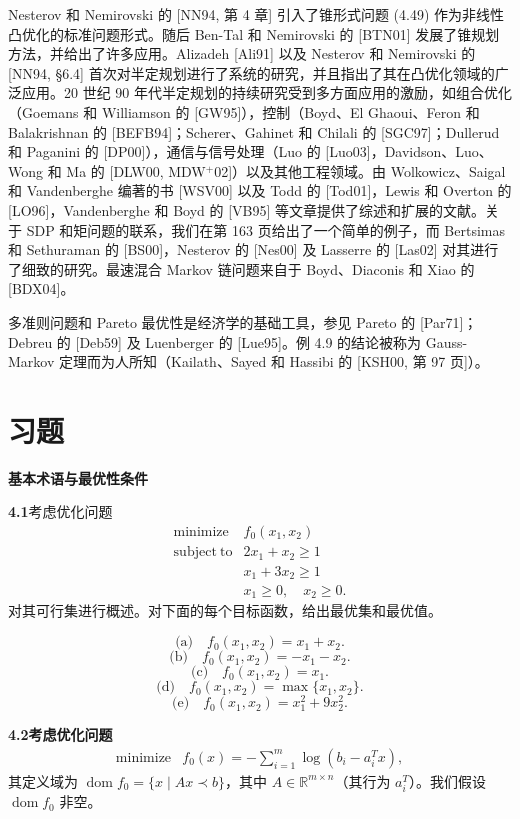 \documentclass[UTF8,12pt,a4paper,fontset=fandol]{ctexart}
\begin{document}
Nesterov 和 Nemirovski 的 [NN94, 第 4 章] 引入了锥形式问题 (4.49) 作为非线性凸优化的标准问题形式。随后 Ben-Tal 和 Nemirovski 的 [BTN01] 发展了锥规划方法，并给出了许多应用。Alizadeh [Ali91] 以及 Nesterov 和 Nemirovski 的 [NN94, \S 6.4] 首次对半定规划进行了系统的研究，并且指出了其在凸优化领域的广泛应用。20 世纪 90 年代半定规划的持续研究受到多方面应用的激励，如组合优化（Goemans 和 Williamson 的 [GW95]），控制（Boyd、El Ghaoui、Feron 和 Balakrishnan 的 [BEFB94]；Scherer、Gahinet 和 Chilali 的 [SGC97]；Dullerud 和 Paganini 的 [DP00]），通信与信号处理（Luo 的 [Luo03]，Davidson、Luo、Wong 和 Ma 的 [DLW00, MDW$^+$02]）以及其他工程领域。由 Wolkowicz、Saigal 和 Vandenberghe 编著的书 [WSV00] 以及 Todd 的 [Tod01]，Lewis 和 Overton 的 [LO96]，Vandenberghe 和 Boyd 的 [VB95] 等文章提供了综述和扩展的文献。关于 SDP 和矩问题的联系，我们在第 163 页给出了一个简单的例子，而 Bertsimas 和 Sethuraman 的 [BS00]，Nesterov 的 [Nes00] 及 Lasserre 的 [Las02] 对其进行了细致的研究。最速混合 Markov 链问题来自于 Boyd、Diaconis 和 Xiao 的 [BDX04]。

多准则问题和 Pareto 最优性是经济学的基础工具，参见 Pareto 的 [Par71]；Debreu 的 [Deb59] 及 Luenberger 的 [Lue95]。例 4.9 的结论被称为 Gauss-Markov 定理而为人所知（Kailath、Sayed 和 Hassibi 的 [KSH00, 第 97 页]）。

\section*{习题}

\noindent\textbf{基本术语与最优性条件}

\noindent\textbf{4.1}\quad 考虑优化问题
\[
\begin{array}{ll}
\mathop{\mathrm{minimize}} & f_0(x_1,x_2)\\
\mathrm{subject\ to} & 2x_1+x_2\geq 1\\
& x_1+3x_2\geq 1\\
& x_1\geq 0,\quad x_2\geq 0.
\end{array}
\]
对其可行集进行概述。对下面的每个目标函数，给出最优集和最优值。

\[
\text{(a)}\quad f_0(x_1,x_2)=x_1+x_2.
\]
\[
\text{(b)}\quad f_0(x_1,x_2)=-x_1-x_2.
\]
\[
\text{(c)}\quad f_0(x_1,x_2)=x_1.
\]
\[
\text{(d)}\quad f_0(x_1,x_2)=\max\{x_1,x_2\}.
\]
\[
\text{(e)}\quad f_0(x_1,x_2)=x_1^2+9x_2^2.
\]

\noindent\textbf{4.2\quad 考虑优化问题}
\[
\begin{array}{ll}
\mathop{\mathrm{minimize}} & f_0(x)=-\sum_{i=1}^m\log(b_i-a_i^Tx),
\end{array}
\]
其定义域为 $\operatorname{dom} f_0=\{x\mid Ax\prec b\}$，其中 $A\in\mathbb{R}^{m\times n}$（其行为 $a_i^T$）。我们假设 $\operatorname{dom} f_0$ 非空。
\end{document}
